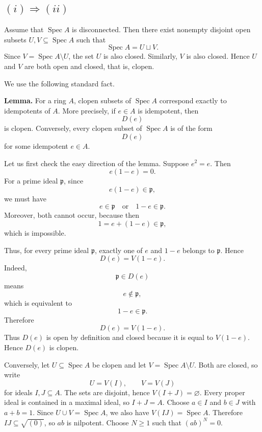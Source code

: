 	\subsection*{\((i)\Rightarrow(ii)\)}
	
	Assume that \(\operatorname{Spec} A\) is disconnected. Then there exist nonempty disjoint open
	subsets \(U,V\subseteq \operatorname{Spec} A\) such that
	\[
	\operatorname{Spec} A=U\sqcup V.
	\]
	Since \(V=\operatorname{Spec} A\setminus U\), the set \(U\) is also closed. Similarly, \(V\) is
	also closed. Hence \(U\) and \(V\) are both open and closed, that is, clopen.
	
	We use the following standard fact.
	
	\medskip
	
	\noindent
	\textbf{Lemma.}
	For a ring \(A\), clopen subsets of \(\operatorname{Spec} A\) correspond exactly to
	idempotents of \(A\). More precisely, if \(e\in A\) is idempotent, then
	\[
	D(e)
	\]
	is clopen. Conversely, every clopen subset of \(\operatorname{Spec} A\) is of the form
	\[
	D(e)
	\]
	for some idempotent \(e\in A\).
	
	\medskip
	
	Let us first check the easy direction of the lemma. Suppose \(e^2=e\). Then
	\[
	e(1-e)=0.
	\]
	For a prime ideal \(\mathfrak p\), since
	\[
	e(1-e)\in\mathfrak p,
	\]
	we must have
	\[
	e\in\mathfrak p
	\quad\text{or}\quad
	1-e\in\mathfrak p.
	\]
	Moreover, both cannot occur, because then
	\[
	1=e+(1-e)\in\mathfrak p,
	\]
	which is impossible.
	
	Thus, for every prime ideal \(\mathfrak p\), exactly one of \(e\) and \(1-e\)
	belongs to \(\mathfrak p\). Hence
	\[
	D(e)=V(1-e).
	\]
	Indeed,
	\[
	\mathfrak p\in D(e)
	\]
	means
	\[
	e\notin\mathfrak p,
	\]
	which is equivalent to
	\[
	1-e\in\mathfrak p.
	\]
	Therefore
	\[
	D(e)=V(1-e).
	\]
	Thus \(D(e)\) is open by definition and closed because it is equal to
	\(V(1-e)\). Hence \(D(e)\) is clopen.
	
	Conversely, let $U\subseteq\operatorname{Spec}A$ be clopen and let
$V=\operatorname{Spec}A\setminus U$. Both are closed, so write
\[
U=V(I),\qquad V=V(J)
\]
for ideals $I,J\subseteq A$. The sets are disjoint, hence
$V(I+J)=\varnothing$. Every proper ideal is contained in a maximal ideal,
so $I+J=A$. Choose $a\in I$ and $b\in J$ with $a+b=1$.
Since $U\cup V=\operatorname{Spec}A$, we also have
$V(IJ)=\operatorname{Spec}A$. Therefore
$IJ\subseteq\sqrt{(0)}$, so $ab$ is nilpotent. Choose $N\ge1$ such
that $(ab)^N=0$.

